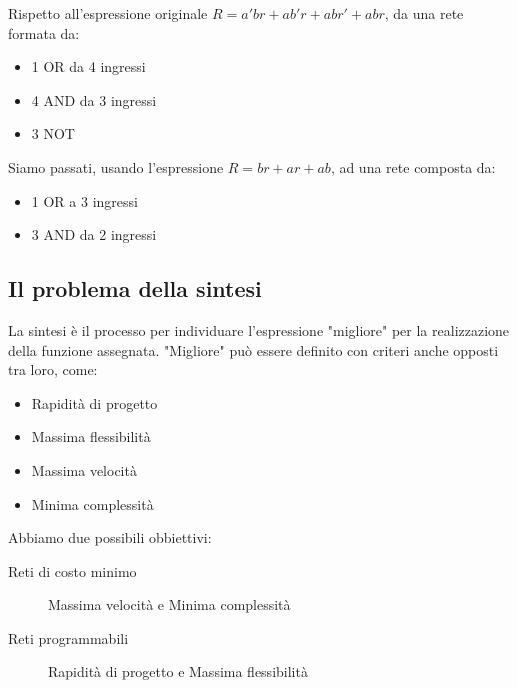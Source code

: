 \documentclass{article}
\begin{document}
\noindent
Rispetto all'espressione originale $R = a'br + ab'r + abr' + abr$, da una rete formata da:

\begin{itemize}
    \item 1 OR da 4 ingressi
    \item 4 AND da 3 ingressi
    \item 3 NOT
\end{itemize}

\noindent
Siamo passati, usando l'espressione $R = br + ar + ab$, ad una rete composta da:

\begin{itemize}
    \item 1 OR a 3 ingressi
    \item 3 AND da 2 ingressi
\end{itemize}

\subsection{Il problema della sintesi}

La sintesi è il processo per individuare l'espressione "migliore" per la realizzazione della funzione assegnata.
"Migliore" può essere definito con criteri anche opposti tra loro, come:

\begin{itemize}
    \item Rapidità di progetto
    \item Massima flessibilità
    \item Massima velocità
    \item Minima complessità
\end{itemize}

\noindent
Abbiamo due possibili obbiettivi:

\begin{description}
	\item[Reti di costo minimo] Massima velocità e Minima complessità
	\item[Reti programmabili] Rapidità di progetto e Massima flessibilità
\end{description}
\end{document}
